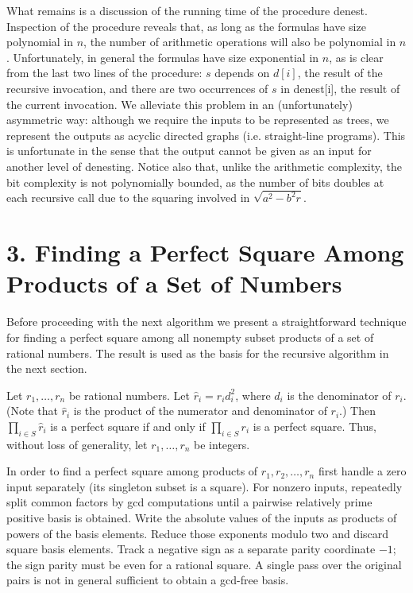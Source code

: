 \documentclass[11pt,letterpaper]{article}
\begin{document}
What remains is a discussion of the running time of the procedure denest. Inspection of the procedure reveals that, as long as the formulas have size polynomial in $n$, the number of arithmetic operations will also be polynomial in $n$. Unfortunately, in general the formulas have size exponential in $n$, as is clear from the last two lines of the procedure: $s$ depends on $d[i]$, the result of the recursive invocation, and there are two occurrences of $s$ in denest[i], the result of the current invocation. We alleviate this problem in an (unfortunately) asymmetric way: although we require the inputs to be represented as trees, we represent the outputs as acyclic directed graphs (i.e. straight-line programs). This is unfortunate in the sense that the output cannot be given as an input for another level of denesting. Notice also that, unlike the arithmetic complexity, the bit complexity is not polynomially bounded, as the number of bits doubles at each recursive call due to the squaring involved in $\sqrt{a^{2}-b^{2} r}$.

\section*{3. Finding a Perfect Square Among Products of a Set of Numbers}
Before proceeding with the next algorithm we present a straightforward technique for finding a perfect square among all nonempty subset products of a set of rational numbers. The result is used as the basis for the recursive algorithm in the next section.

Let $r_{1}, \ldots, r_{n}$ be rational numbers. Let $\hat{r}_{i}=r_{i} d_{i}^{2}$, where $d_{i}$ is the denominator of $r_{i}$. (Note that $\hat{r}_{i}$ is the product of the numerator and denominator of $r_{i}$.) Then $\prod_{i\in S}\hat r_i$ is a perfect square if and only if $\prod_{i \in S} r_{i}$ is a perfect square. Thus, without loss of generality, let $r_{1}, \ldots, r_{n}$ be integers.

In order to find a perfect square among products of $r_{1}, r_{2}, \ldots, r_{n}$ first handle a zero input separately (its singleton subset is a square). For nonzero inputs, repeatedly split common factors by gcd computations until a pairwise relatively prime positive basis is obtained. Write the absolute values of the inputs as products of powers of the basis elements. Reduce those exponents modulo two and discard square basis elements. Track a negative sign as a separate parity coordinate $-1$; the sign parity must be even for a rational square. A single pass over the original pairs is not in general sufficient to obtain a gcd-free basis.
\end{document}
